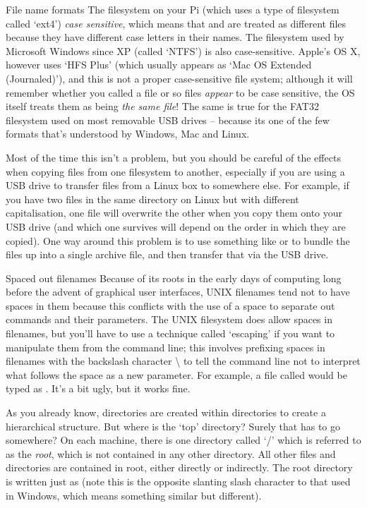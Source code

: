 \begin{danger}{File name formats}
The filesystem on your Pi (which uses a type of filesystem called `ext4') \textit{case sensitive}, which means that  and  are treated as different files because they have different case letters in their names. The filesystem used by Microsoft Windows since XP (called `NTFS') is also case-sensitive. Apple's OS X, however uses `HFS Plus' (which usually appears as `Mac OS Extended (Journaled)'), and this is not a proper case-sensitive file system; although it will remember whether you called a file  or  so files \textit{appear} to be case sensitive, the OS itself treats them as being \textit{the same file}! The same is true for the FAT32 filesystem used on most removable USB drives -- because its one of the few formats that's understood by Windows, Mac and Linux. 

Most of the time this isn't a problem, but you should be careful of the effects when copying files from one filesystem to another, especially if you are using a USB drive to transfer files from a Linux box to somewhere else. For example, if you have two files in the same directory on Linux but with different capitalisation, one file will overwrite the other when you copy them onto your USB drive (and which one survives will depend on the order in which they are copied). One way around this problem is to use something like  or  to bundle the files up into a single archive file, and then transfer that via the USB drive. 
\end{danger}

\begin{linux}{Spaced out filenames}
Because of its roots in the early days of computing long before the advent of graphical user interfaces, UNIX filenames tend not to have spaces in them because this conflicts with the use of a space to separate out commands and their parameters. The UNIX filesystem does allow spaces in filenames, but you'll have to use a technique called `escaping' if you want to manipulate them from the command line; this involves prefixing spaces in filenames with the backslash character \textbackslash{} to tell the command line not to interpret what follows the space as a new parameter. For example, a file called  would be typed as . It's a bit ugly, but it works fine. 
\end{linux} 

As you already know, directories are created within directories to create a hierarchical structure. But where is the `top' directory? Surely that has to go somewhere? On each machine, there is one directory called `/' which is referred to as the \textit{root}, which is not contained in any other directory. All other files and directories are contained in root, either directly or indirectly. The root directory is written just as \fname{/} (note this is the opposite slanting slash character to that used in Windows, which means something similar but different). 

